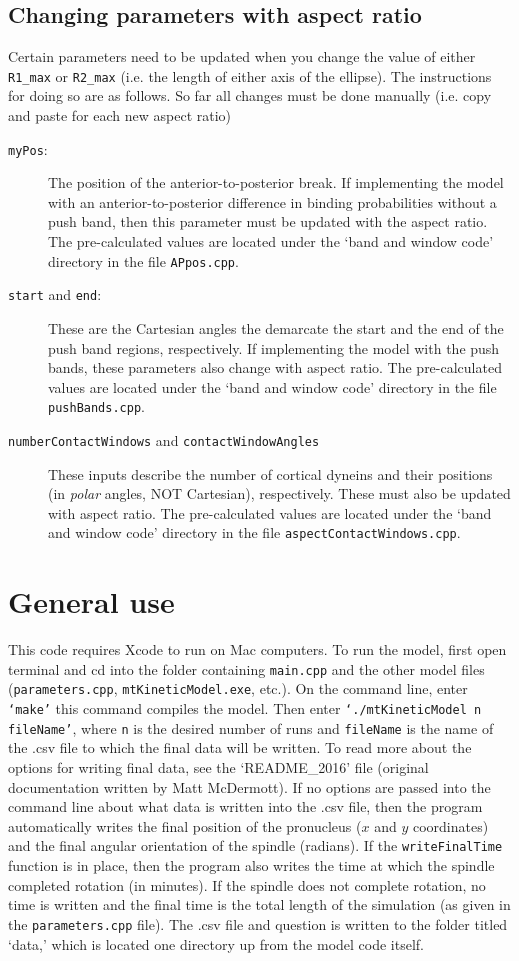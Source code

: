 \documentclass{article}
\begin{document}
\subsection{Changing parameters with aspect ratio}
Certain parameters need to be updated when you change the value of either \texttt{R1\_max} or \texttt{R2\_max} (i.e. the length of either axis of the ellipse). The instructions for doing so are as follows. So far all changes must be done manually (i.e. copy and paste for each new aspect ratio)
\begin{description}
  \item[\texttt{myPos}:] The position of the anterior-to-posterior break. If implementing the model with an anterior-to-posterior difference in binding probabilities without a push band, then this parameter must be updated with the aspect ratio. The pre-calculated values are located under the `band and window code' directory in the file \texttt{APpos.cpp}.
  \item[\texttt{start} and \texttt{end}:] These are the Cartesian angles the demarcate the start and the end of the push band regions, respectively. If implementing the model with the push bands, these parameters also change with aspect ratio. The pre-calculated values are located under the `band and window code' directory in the file \texttt{pushBands.cpp}.
  \item[\texttt{numberContactWindows} and \texttt{contactWindowAngles}] These inputs describe the number of cortical dyneins and their positions (in \emph{polar} angles, NOT Cartesian), respectively. These must also be updated with aspect ratio. The pre-calculated values are located under the `band and window code' directory in the file \texttt{aspectContactWindows.cpp}.
\end{description}

\section{General use}
This code requires Xcode to run on Mac computers. To run the model, first open terminal and cd into the folder containing \texttt{main.cpp} and the other model files (\texttt{parameters.cpp}, \texttt{mtKineticModel.exe}, etc.). On the command line, enter \texttt{`make'} \textendash this command compiles the model. Then enter \texttt{`./mtKineticModel n fileName'}, where \texttt{n} is the desired number of runs and \texttt{fileName} is the name of the .csv file to which the final data will be written. To read more about the options for writing final data, see the `README\_2016' file (original documentation written by Matt McDermott). If no options are passed into the command line about what data is written into the .csv file, then the program automatically writes the final position of the pronucleus ($x$ and $y$ coordinates) and the final angular orientation of the spindle (radians). If the \texttt{writeFinalTime} function is in place, then the program also writes the time at which the spindle completed rotation (in minutes). If the spindle does not complete rotation, no time is written and the final time is the total length of the simulation (as given in the \texttt{parameters.cpp} file). The .csv file and question is written to the folder titled `data,' which is located one directory up from the model code itself.
\end{document}
